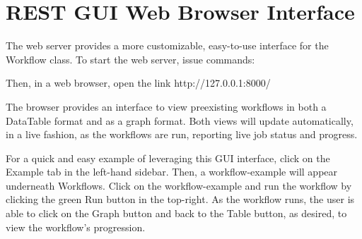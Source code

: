 \section{REST GUI Web Browser
Interface}\label{rest-gui-web-browser-interface}

The web server provides a more customizable, easy-to-use interface for
the Workflow class. To start the web server, issue commands:

\begin{Shaded}
\begin{Highlighting}[]
\end{Highlighting}
\end{Shaded}

Then, in a web browser, open the link http://127.0.0.1:8000/

The browser provides an interface to view preexisting workflows in both
a DataTable format and as a graph format. Both views will update
automatically, in a live fashion, as the workflows are run, reporting
live job status and progress.

For a quick and easy example of leveraging this GUI interface, click on
the Example tab in the left-hand sidebar. Then, a workflow-example will
appear underneath Workflows. Click on the workflow-example and run the
workflow by clicking the green Run button in the top-right. As the
workflow runs, the user is able to click on the Graph button and back to
the Table button, as desired, to view the workflow's progression.
